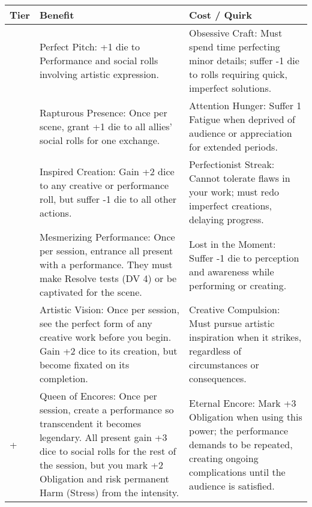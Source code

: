 \begin{longtable}{>{\raggedright\arraybackslash}p{1cm} p{5cm} p{5cm}}
\toprule
\textbf{Tier} & \textbf{Benefit} & \textbf{Cost / Quirk} \\
\midrule
1 & Perfect Pitch: +1 die to Performance and social rolls involving artistic expression. & Obsessive Craft: Must spend time perfecting minor details; suffer -1 die to rolls requiring quick, imperfect solutions. \\
\midrule
2 & Rapturous Presence: Once per scene, grant +1 die to all allies' social rolls for one exchange. & Attention Hunger: Suffer 1 Fatigue when deprived of audience or appreciation for extended periods. \\
\midrule
3 & Inspired Creation: Gain +2 dice to any creative or performance roll, but suffer -1 die to all other actions. & Perfectionist Streak: Cannot tolerate flaws in your work; must redo imperfect creations, delaying progress. \\
\midrule
4 & Mesmerizing Performance: Once per session, entrance all present with a performance. They must make Resolve tests (DV 4) or be captivated for the scene. & Lost in the Moment: Suffer -1 die to perception and awareness while performing or creating. \\
\midrule
5 & Artistic Vision: Once per session, see the perfect form of any creative work before you begin. Gain +2 dice to its creation, but become fixated on its completion. & Creative Compulsion: Must pursue artistic inspiration when it strikes, regardless of circumstances or consequences. \\
\midrule
6+ & Queen of Encores: Once per session, create a performance so transcendent it becomes legendary. All present gain +3 dice to social rolls for the rest of the session, but you mark +2 Obligation and risk permanent Harm (Stress) from the intensity. & Eternal Encore: Mark +3 Obligation when using this power; the performance demands to be repeated, creating ongoing complications until the audience is satisfied. \\
\bottomrule
\end{longtable}